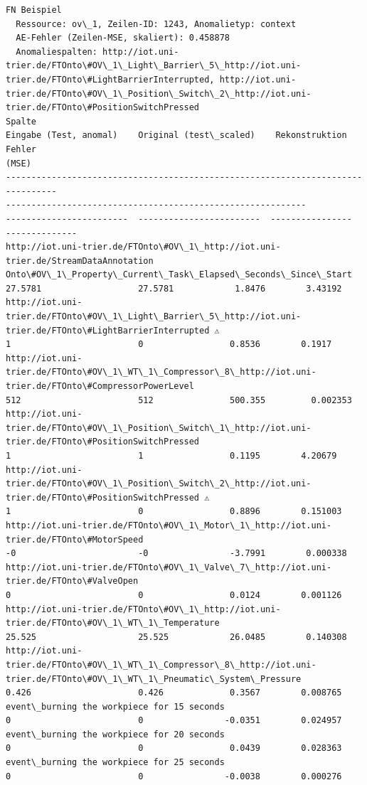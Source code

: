 \documentclass[11pt]{article}
\begin{document}
\begin{Verbatim}[commandchars=\\\{\}]
FN Beispiel
  Ressource: ov\_1, Zeilen-ID: 1243, Anomalietyp: context
  AE-Fehler (Zeilen-MSE, skaliert): 0.458878
  Anomaliespalten: http://iot.uni-
trier.de/FTOnto\#OV\_1\_Light\_Barrier\_5\_http://iot.uni-
trier.de/FTOnto\#LightBarrierInterrupted, http://iot.uni-
trier.de/FTOnto\#OV\_1\_Position\_Switch\_2\_http://iot.uni-
trier.de/FTOnto\#PositionSwitchPressed
Spalte
Eingabe (Test, anomal)    Original (test\_scaled)    Rekonstruktion    Fehler
(MSE)
--------------------------------------------------------------------------------
-----------------------------------------------------------
------------------------  ------------------------  ----------------
--------------
http://iot.uni-trier.de/FTOnto\#OV\_1\_http://iot.uni-trier.de/StreamDataAnnotation
Onto\#OV\_1\_Property\_Current\_Task\_Elapsed\_Seconds\_Since\_Start
27.5781                   27.5781            1.8476        3.43192
http://iot.uni-trier.de/FTOnto\#OV\_1\_Light\_Barrier\_5\_http://iot.uni-
trier.de/FTOnto\#LightBarrierInterrupted ⚠
1                         0                 0.8536        0.1917
http://iot.uni-trier.de/FTOnto\#OV\_1\_WT\_1\_Compressor\_8\_http://iot.uni-
trier.de/FTOnto\#CompressorPowerLevel
512                       512               500.355         0.002353
http://iot.uni-trier.de/FTOnto\#OV\_1\_Position\_Switch\_1\_http://iot.uni-
trier.de/FTOnto\#PositionSwitchPressed
1                         1                 0.1195        4.20679
http://iot.uni-trier.de/FTOnto\#OV\_1\_Position\_Switch\_2\_http://iot.uni-
trier.de/FTOnto\#PositionSwitchPressed ⚠
1                         0                 0.8896        0.151003
http://iot.uni-trier.de/FTOnto\#OV\_1\_Motor\_1\_http://iot.uni-
trier.de/FTOnto\#MotorSpeed
-0                        -0                -3.7991        0.000338
http://iot.uni-trier.de/FTOnto\#OV\_1\_Valve\_7\_http://iot.uni-
trier.de/FTOnto\#ValveOpen
0                         0                 0.0124        0.001126
http://iot.uni-trier.de/FTOnto\#OV\_1\_http://iot.uni-
trier.de/FTOnto\#OV\_1\_WT\_1\_Temperature
25.525                    25.525            26.0485        0.140308
http://iot.uni-trier.de/FTOnto\#OV\_1\_WT\_1\_Compressor\_8\_http://iot.uni-
trier.de/FTOnto\#OV\_1\_WT\_1\_Pneumatic\_System\_Pressure
0.426                     0.426             0.3567        0.008765
event\_burning the workpiece for 15 seconds
0                         0                -0.0351        0.024957
event\_burning the workpiece for 20 seconds
0                         0                 0.0439        0.028363
event\_burning the workpiece for 25 seconds
0                         0                -0.0038        0.000276

\end{Verbatim}
\end{document}
